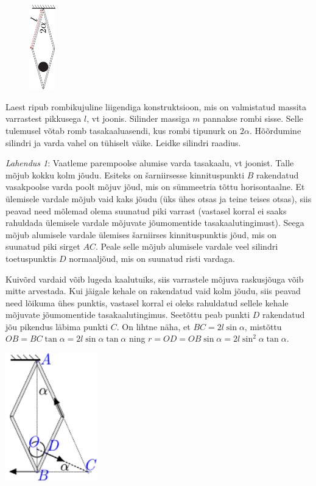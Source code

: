 
\begin{figure}
  \vspace*{-0mm}
  \includegraphics[width = 0.1\textwidth]{2024-v3g-07-yl.pdf}
\end{figure}
Laest ripub rombikujuline liigendiga konstruktsioon, mis on valmistatud massita varrastest pikkusega $l$, vt joonis. Silinder massiga $m$ pannakse rombi sisse. Selle tulemusel võtab romb tasakaaluasendi, kus rombi tipunurk on $2\alpha$. Hõõrdumine silindri ja varda vahel on tühiselt väike. Leidke silindri raadius.


\hint

\solu
\textit{Lahendus 1}: Vaatleme parempoolse alumise varda tasakaalu, vt joonist. Talle mõjub kokku kolm jõudu. Esiteks on šarniirsesse kinnituspunkti $B$ rakendatud vasakpoolse varda poolt mõjuv jõud, mis on sümmeetria tõttu horisontaalne. Et ülemisele vardale mõjub vaid kaks jõudu (üks ühes otsas ja teine teises otsas), siis peavad need mõlemad olema suunatud piki varrast (vastasel korral ei saaks rahuldada ülemisele vardale mõjuvate  jõumomentide tasakaalutingimust). Seega mõjub alumisele vardale ülemises šarniirses kinnituspunktis jõud, mis on suunatud piki sirget $AC$. Peale selle mõjub alumisele vardale veel silindri toetuspunktis $D$ normaaljõud, mis on suunatud risti vardaga.

Kuivõrd vardaid võib lugeda kaalutuiks, siis varrastele mõjuva raskusjõuga võib mitte arvestada. Kui jäigale kehale on rakendatud vaid kolm jõudu, siis peavad need lõikuma ühes punktis, vastasel korral ei oleks rahuldatud sellele kehale mõjuvate  jõumomentide tasakaalutingimus. Seetõttu peab punkti $D$ rakendatud jõu pikendus läbima punkti $C$. On lihtne näha, et $BC=2l\sin\alpha$, mistõttu $OB=BC\tan\alpha=2l\sin\alpha\tan\alpha$ ning $r=OD=OB\sin\alpha=2l\sin^2\alpha\tan\alpha$.
\begin{center}
  \includegraphics[width=0.3\textwidth]{2024-v3g-07-sol.pdf}
\end{center}

